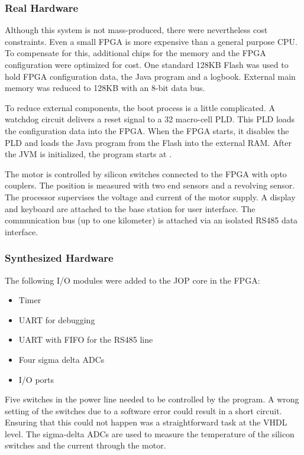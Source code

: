 \subsubsection{Real Hardware}

Although this system is not mass-produced, there were nevertheless
cost constraints. Even a small FPGA is more expensive than a general
purpose CPU. To compensate for this, additional chips for the memory
and the FPGA configuration were optimized for cost. One standard
128KB Flash was used to hold FPGA configuration data, the Java
program and a logbook. External main memory was reduced to 128KB
with an 8-bit data bus.

To reduce external components, the boot process is a little
complicated. A watchdog circuit delivers a reset signal to a 32
macro-cell PLD. This PLD loads the configuration data into the FPGA.
When the FPGA starts, it disables the PLD and loads the Java program
from the Flash into the external RAM. After the JVM is initialized,
the program starts at .

The motor is controlled by silicon switches connected to the FPGA
with opto couplers. The position is measured with two end sensors
and a revolving sensor. The processor supervises the voltage and
current of the motor supply. A display and keyboard are attached to
the base station for user interface. The communication bus (up to
one kilometer) is attached via an isolated RS485 data interface.

\subsubsection{Synthesized Hardware}

The following I/O modules were added to the JOP core in the FPGA:
%
\begin{itemize}
\item Timer
\item UART for debugging
\item UART with FIFO for the RS485 line
\item Four sigma delta ADCs
\item I/O ports
\end{itemize}
%
Five switches in the power line needed to be controlled by the
program. A wrong setting of the switches due to a software error
could result in a short circuit. Ensuring that this could not happen
was a straightforward task at the VHDL level. The sigma-delta ADCs
are used to measure the temperature of the silicon switches and the
current through the motor.

